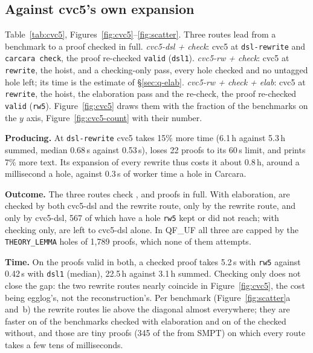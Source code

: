\documentclass[11pt,a4paper]{article}
\newcommand{\UF}{QF\_UF}
\newcommand{\code}[1]{\texttt{#1}}
\begin{document}
\subsection{Against cvc5's own expansion}\label{sec:q-cvc5}

Table~\ref{tab:cvc5}, Figures~\ref{fig:cvc5}--\ref{fig:scatter}. Three
routes lead from a benchmark to a proof checked in full.
\emph{cvc5-dsl + check}: cvc5 at \code{dsl-rewrite} and \code{carcara check},
the proof re-checked \code{valid} (\code{dsl1}). \emph{cvc5-rw + check}: cvc5
at \code{rewrite}, the hoist, and a checking-only pass, every hole checked
and no untagged hole left; its time is the estimate of
\S\ref{sec:q-elab}. \emph{cvc5-rw + check + elab}: cvc5 at \code{rewrite},
the hoist, the elaboration pass and the re-check, the proof re-checked
\code{valid} (\code{rw5}). Figure~\ref{fig:cvc5} draws them with the
fraction of the benchmarks on the $y$ axis, Figure~\ref{fig:cvc5-count}
with their number.

\textbf{Producing.} At \code{dsl-rewrite} cvc5 takes 15\% more time
(6.1\,h against 5.3\,h summed, median 0.68\,s against 0.53\,s), loses 22
proofs to its 60\,s limit, and prints 7\% more text. Its expansion of every
rewrite thus costs it about 0.8\,h, around a millisecond a hole, against
0.3\,s of worker time a hole in Carcara.

\textbf{Outcome.} The three routes check \dslvalid{}, \checkfull{} and
\rwvalid{} proofs in full. With elaboration, \nboth{} are checked by both
cvc5-dsl and the rewrite route, \rwonly{} only by the rewrite route, and
\dslonly{} only by cvc5-dsl, 567 of which have a hole \code{rw5} kept or did
not reach; with checking only, \checkdslonly{} are left to cvc5-dsl alone.
In \UF{} all three are capped by the \code{THEORY\_LEMMA} holes of 1,789
proofs, which none of them attempts.

\textbf{Time.} On the \nboth{} proofs valid in both, a checked proof takes
5.2\,s with \code{rw5} against 0.42\,s with \code{dsl1} (median), 22.5\,h
against 3.1\,h summed. Checking only does not close the gap: the two
rewrite routes nearly coincide in Figure~\ref{fig:cvc5}, the cost being
egglog's, not the reconstruction's. Per benchmark (Figure~\ref{fig:scatter}a
and~b) the rewrite routes lie above the diagonal almost everywhere; they
are faster on \elabfaster{} of the \nboth{} benchmarks checked with
elaboration and on \checkfaster{} of the \checkboth{} checked without, and
those are tiny proofs (345 of the \elabfaster{} from SMPT) on which every
route takes a few tens of milliseconds.
\end{document}
